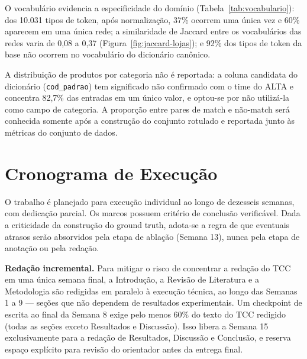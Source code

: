 \documentclass[
    article,
    12pt,
    oneside,
    a4paper,
    english,
    brazilian
    ]{abntex2}
\numberwithin{equation}{section}
\begin{document}




O vocabulário evidencia a especificidade do domínio (Tabela~\ref{tab:vocabulario}): dos 10.031 tipos de token, após normalização, 37\% ocorrem uma única vez e 60\% aparecem em uma única rede; a similaridade de Jaccard entre os vocabulários das redes varia de 0,08 a 0,37 (Figura~\ref{fig:jaccard-lojas}); e 92\% dos tipos de token da base não ocorrem no vocabulário do dicionário canônico.





A distribuição de produtos por categoria não é reportada: a coluna candidata do dicionário (\texttt{cod\_padrao}) tem significado não confirmado com o time do ALTA e concentra 82,7\% das entradas em um único valor, e optou-se por não utilizá-la como campo de categoria. A proporção entre pares de match e não-match será conhecida somente após a construção do conjunto rotulado e reportada junto às métricas do conjunto de dados.

\section{Cronograma de Execução}

O trabalho é planejado para execução individual ao longo de dezesseis semanas, com dedicação parcial. Os marcos possuem critério de conclusão verificável. Dada a criticidade da construção do ground truth, adota-se a regra de que eventuais atrasos serão absorvidos pela etapa de ablação (Semana 13), nunca pela etapa de anotação ou pela redação.

\textbf{Redação incremental.} Para mitigar o risco de concentrar a redação do TCC em uma única semana final, a Introdução, a Revisão de Literatura e a Metodologia são redigidas em paralelo à execução técnica, ao longo das Semanas 1 a 9 --- seções que não dependem de resultados experimentais. Um checkpoint de escrita ao final da Semana 8 exige pelo menos 60\% do texto do TCC redigido (todas as seções exceto Resultados e Discussão). Isso libera a Semana 15 exclusivamente para a redação de Resultados, Discussão e Conclusão, e reserva espaço explícito para revisão do orientador antes da entrega final.
\end{document}
